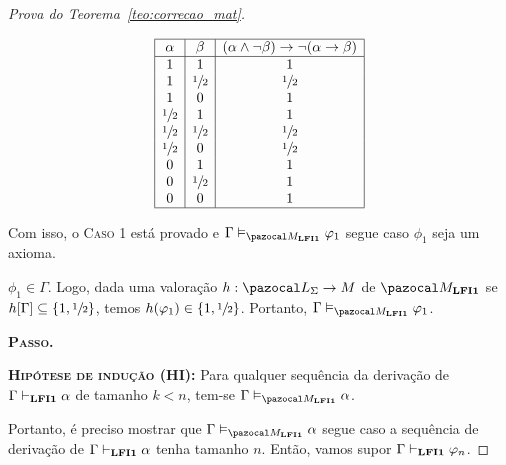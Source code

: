 \begin{proof}[Prova do Teorema~\ref{teo:correcao_mat}]
\begin{provaporcasos}
\begin{provaporsubcasos}
                \begin{center}
                    \[
                        \begin{array}{|c|c|c|}%
                            \hline
                            \alpha      & \beta & (\alpha \land \neg \beta) \to \neg(\alpha \to \beta) \\
                            \hline%
                            1 & 1 & 1\\
                            1 & \meio{} & \meio{}\\
                            1 & 0 & 1\\
                            \meio{} & 1 & 1\\
                            \meio{} & \meio{} &\meio{}\\ 
                            \meio{} & 0 & \meio{}\\
                            0 & 1 & 1\\
                            0 & \meio{} & 1\\
                            0 & 0 & 1\\
                            \hline
                        \end{array}
                    \]
                \end{center}
                
            \end{provaporsubcasos}

            Com isso, o \textsc{Caso 1} está provado e $\Gamma \conmat \phi_{1}$ segue caso $\phi_{1}$ seja um axioma.

            \casodeprova{} $\phi_{1} \in \Gamma$. Logo, dada uma valoração $h : \ling{} \to M$ de $\mat{}$ se $h[\Gamma] \subseteq \{1, \sfrac{1}{2}{}\}$, temos $h(\varphi_{1}) \in \{1, \sfrac{1}{2}{}\}$. Portanto, $\Gamma \conmat \phi_{1}$.

        \end{provaporcasos}

         \noindent \textbf{\textsc{Passo.}}
         
         \noindent \textbf{\textsc{Hipótese de indução (HI):}} Para qualquer sequência da derivação de $\Gamma \vdash_{{\normalfont\textbf{LFI1}}{}} \alpha$ de tamanho $k < n$, tem-se $\Gamma \conmat \alpha$. 
         
         Portanto, é preciso mostrar que $\Gamma \conmat \alpha$ segue caso a sequência de derivação de $\Gamma \vdash_{{\normalfont\textbf{LFI1}}{}} \alpha$ tenha tamanho $n$. Então, vamos supor $\Gamma \vdash_{{\normalfont\textbf{LFI1}}{}} \varphi_{n}$.
         

\end{proof}

